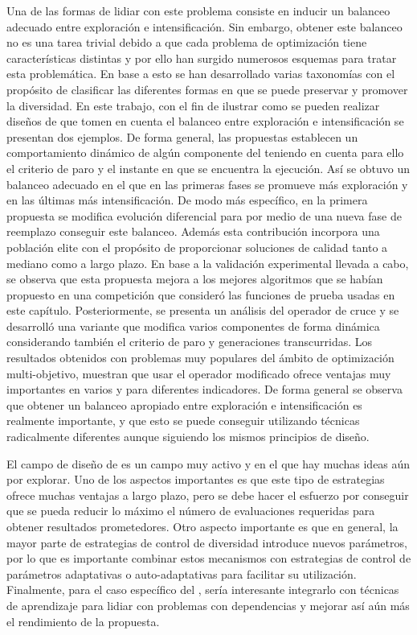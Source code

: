 %
Una de las formas de lidiar con este problema consiste en inducir un balanceo adecuado entre exploración e intensificación.
%
Sin embargo, obtener este balanceo no es una tarea trivial debido a que cada problema de optimización tiene características distintas y por
ello han surgido numerosos esquemas para tratar esta problemática.
%
En base a esto se han desarrollado varias taxonomías con el propósito de clasificar las diferentes formas en que se puede preservar y promover la diversidad.
%
En este trabajo, con el fin de ilustrar como se pueden realizar diseños de \EAS{} que tomen en cuenta el balanceo entre exploración e intensificación
se presentan dos ejemplos.
%
De forma general, las propuestas establecen un comportamiento dinámico de algún componente del \EA{} teniendo en cuenta para ello el criterio de paro 
y el instante en que se encuentra la ejecución.
%
Así se obtuvo un balanceo adecuado en el que en las primeras fases se promueve más exploración y en las últimas más intensificación. 
%
De modo más específico, en la primera propuesta se modifica evolución diferencial para por medio de una nueva fase de reemplazo conseguir este balanceo. 
%
Además esta contribución incorpora una población elite con el propósito de proporcionar soluciones de calidad tanto a mediano como a largo plazo.
%
En base a la validación experimental llevada a cabo, se observa que esta propuesta mejora a los mejores algoritmos que se habían propuesto en una competición
que consideró las funciones de prueba usadas en este capítulo.
%
Posteriormente, se presenta un análisis del operador de cruce \SBX{} y se desarrolló una variante que modifica varios componentes de forma dinámica
considerando también el criterio de paro y generaciones transcurridas. 
%
Los resultados obtenidos con problemas muy populares del ámbito de optimización multi-objetivo, muestran que usar el operador \SBX{} modificado ofrece ventajas muy importantes
en varios \MOEAS{} y para diferentes indicadores.
%
De forma general se observa que obtener un balanceo apropiado entre exploración e intensificación es realmente importante, y que
esto se puede conseguir utilizando técnicas radicalmente diferentes aunque siguiendo los mismos principios de diseño.

El campo de diseño de \EAS{} es un campo muy activo y en el que hay muchas ideas aún por explorar.
%
Uno de los aspectos importantes es que este tipo de estrategias ofrece muchas ventajas a largo plazo, pero se debe hacer el esfuerzo por conseguir
que se pueda reducir lo máximo el número de evaluaciones requeridas para obtener resultados prometedores.
%
Otro aspecto importante es que en general, la mayor parte de estrategias de control de diversidad introduce nuevos parámetros, por lo que es importante
combinar estos mecanismos con estrategias de control de parámetros adaptativas o auto-adaptativas para facilitar su utilización.
%
Finalmente, para el caso específico del \SBX{}, sería interesante integrarlo con técnicas de aprendizaje para lidiar con problemas con dependencias y mejorar
así aún más el rendimiento de la propuesta.
